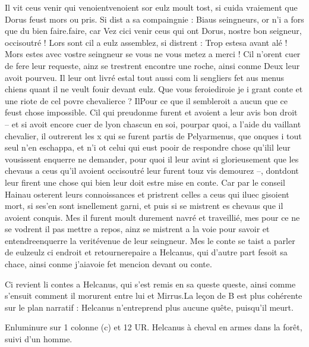 \documentclass{article}
\begin{document}
\begin{pages}
   Il vit ceus venir qui venoientvenoient sor eulz moult tost, si cuida 
   vraiement que Dorus feust mors ou pris. Si dist a sa compaingnie :
   Biaus seingneurs, or n’i a fors que du bien 
      faire.faire, car Vez 
      cici venir ceus qui ont 
      Dorus, nostre bon seigneur, 
      occisoutré ! \pend
\pstart Lors sont cil a eulz assemblez, si distrent :
   Trop estesa avant alé ! Mors estes avec 
      vostre seingneur se vous ne vous metez a merci !
   Cil n’orent cuer de fere leur requeste, ainz se trestrent encontre une roche, 
   ainsi conme Deux leur avoit pourveu. 
   Il leur ont livré estal tout aussi com li sengliers fet aus menus chiens quant il ne veult fouir devant eulz. 
   Que vous feroiediroie je 
      i grant conte et une riote de 
   cel povre chevalierce ? 
   IlPour ce que il sembleroit a aucun que ce feust chose impossible. 
   Cil qui preudonme furent et avoient a leur avis bon droit 
   – et si avoit encore cuer de lyon chascun en soi, pourpar quoi, 
   a l’aide du vaillant chevalier, 
   il outrerent les x qui se furent partis de Pelyarmenus, 
   que onques i tout seul n’en eschappa, et n’i ot celui qui eust pooir de respondre chose 
   qu’ilil leur vousissent enquerre ne demander, pour quoi il leur avint si 
   glorieusement que les chevaus a ceus qu’il avoient occisoutré leur furent 
   touz vis demourez –, dontdont leur firent une chose qui 
   bien leur doit 
      estre mise en conte. Car par le conseil Hainau osterent leurs connoissances et pristrent 
   celles a ceus qui iluec gisoient mort, si ses'en sont isnellement garni, 
   et puis si se mistrent es chevaus que il avoient conquis. Mes il furent moult durement navré et traveillié, mes pour ce ne se vodrent 
   il pas mettre a repos, ainz se mistrent a la voie pour savoir et 
   entendreenquerre la 
   veritévenue de 
   leur seingneur. Mes le conte se taist
      a parler de 
      eulzeulz ci endroit et 
      retournerepaire a Helcanus, 
   qui d’autre part fesoit sa chace, ainsi conme j’aiavoie 
      fet mencion devant ou conte. \pend
 
         
            Ci revient li contes a Helcanus,
               qui s’est remis en sa queste
                  queste, ainsi comme s'ensuit
                  comment il morurent entre lui et Mirrus.La leçon de 
                  B est plus cohérente sur le plan narratif : Helcanus n'entreprend plus aucune quête, puisqu'il meurt.
            
               Enluminure sur 1 colonne (c) et 12 UR. 
                  Helcanus à cheval en armes dans la forêt, 
                  suivi d’un homme.
               

\end{pages}
\end{document}
